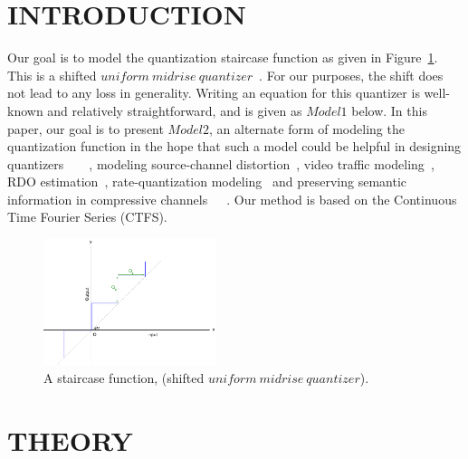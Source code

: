\documentclass[12pt]{article}
\begin{document}
\section{INTRODUCTION}
Our goal is to model the quantization staircase function as given in Figure~\ref{fig:Staircase}.  This is a shifted $uniform \ midrise \ quantizer$~\cite{2005_BOOK_DataCompression_Sayood}.  For our purposes, the shift does not lead to any loss in generality.  Writing an equation for this quantizer is well-known and relatively straightforward, and is given as $Model 1$ below.  In this paper, our goal is to present $Model 2$, an alternate form of modeling the quantization function in the hope that such a model could be helpful in designing quantizers~\cite{1982_JNL_LeastSquaresQuantization_Lloyd}~\cite{1991_BOOK_VQ_GershoGray}~\cite{1996_JNL_AdvancesRVQ_Barnes}~\cite{1997_BOOK_SignalCompression_Jayant}, modeling source-channel distortion~\cite{2009_JNL_MPEG4JointSourceChannelDistortion_Sabir}, video traffic modeling~\cite{2002_JNL_MPEG2traffic_Ansari}, RDO estimation~\cite{2007_JNL_H264rateDistortion_Yang}, rate-quantization modeling~\cite{1996_JNL_MPEG4RateControl_Wei} and preserving semantic information in compressive channels~\cite{2009_CNF_CVcompMS1_Aslam}~\cite{2009_CNF_Compensation_Aslam}~\cite{2009_CNF_RobustSurveillance_Aslam}.  Our method is based on the Continuous Time Fourier Series (CTFS).

		\begin{figure}[t]
		\centering
		\includegraphics[width=0.45\textwidth]{figs/Quantization_1_staircase}
		\caption{A staircase function, (shifted $uniform \ midrise \ quantizer$).}
		\label{fig:Staircase}
		\end{figure}

\section{THEORY}
		
\end{document}
